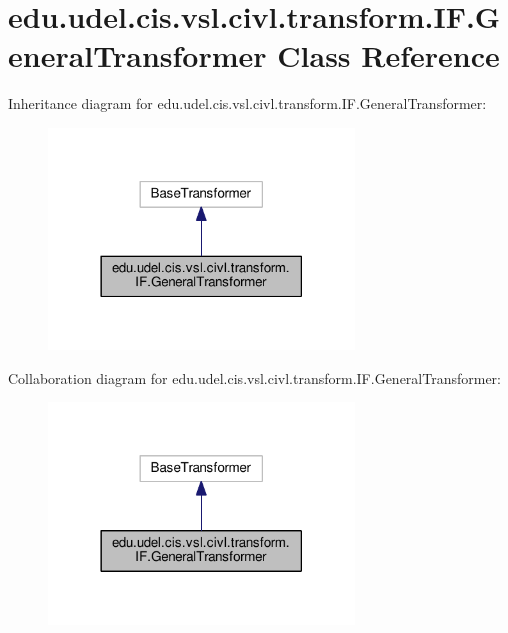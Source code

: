 \hypertarget{classedu_1_1udel_1_1cis_1_1vsl_1_1civl_1_1transform_1_1IF_1_1GeneralTransformer}{}\section{edu.\+udel.\+cis.\+vsl.\+civl.\+transform.\+I\+F.\+General\+Transformer Class Reference}
\label{classedu_1_1udel_1_1cis_1_1vsl_1_1civl_1_1transform_1_1IF_1_1GeneralTransformer}


Inheritance diagram for edu.\+udel.\+cis.\+vsl.\+civl.\+transform.\+I\+F.\+General\+Transformer\+:
\nopagebreak
\begin{figure}[H]
\begin{center}
\leavevmode
\includegraphics[width=230pt]{classedu_1_1udel_1_1cis_1_1vsl_1_1civl_1_1transform_1_1IF_1_1GeneralTransformer__inherit__graph}
\end{center}
\end{figure}


Collaboration diagram for edu.\+udel.\+cis.\+vsl.\+civl.\+transform.\+I\+F.\+General\+Transformer\+:
\nopagebreak
\begin{figure}[H]
\begin{center}
\leavevmode
\includegraphics[width=230pt]{classedu_1_1udel_1_1cis_1_1vsl_1_1civl_1_1transform_1_1IF_1_1GeneralTransformer__coll__graph}
\end{center}
\end{figure}
